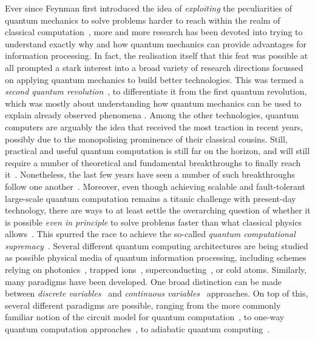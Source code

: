 Ever since Feynman first introduced the idea of \emph{exploiting} the peculiarities of quantum mechanics to solve problems harder to reach within the realm of classical computation~\cite{feynman1982simulating}, more and more research has been devoted into trying to understand exactly why and how quantum mechanics can provide advantages for information processing.
In fact, the realisation itself that this feat was possible at all prompted a stark interest into a broad variety of research directions focussed on applying quantum mechanics to build better technologies. This was termed a \textit{second quantum revolution}~\cite{dowling2003quantum}, to differentiate it from the first quantum revolution, which was mostly about understanding how quantum mechanics can be used to explain already observed phenomena .
Among the other technologies, quantum computers are arguably the idea that received the most traction in recent years, possibly due to the monopolising prominence of their classical cousins.
Still, practical and useful quantum computation is still far on the horizon, and will still require a number of theoretical and fundamental breakthroughs to finally reach it~\cite{preskill2018quantum,flamini2018photonic,wang2019integrated}.
Nonetheless, the last few years have seen a number of such breakthroughs follow one another~\cite{fowler2012surface,barends2014superconducting,córcoles2015demonstration,ofek2016extending,arute2019quantum}.
Moreover, even though achieving scalable and fault-tolerant large-scale quantum computation remains a titanic challenge with present-day technology, there are ways to at least settle the overarching question of whether it is possible \textit{even in principle} to solve problems faster than what classical physics allows~\cite{aaronson2011computational,bremner2016average,boixo2018characterizing,aaronson2017complexity,neill2018blueprint}. This spurred the race to achieve the so-called \textit{quantum computational supremacy}~\cite{broome2012photonic,spring2012boson,crespi2013integrated,tillmann2013experimental,bentivegna2015experimental,zhong201812photon,zhong2019experimental,wang2019boson,bouland2018complexity,arute2019quantum}.
Several different quantum computing architectures are being studied as possible physical media of quantum information processing, including schemes relying on photonics~\cite{wang2019integrated,flamini2018photonic}, trapped ions~\cite{bruzewicz2019trappedion,lekitsch2017blueprint}, superconducting~\cite{krantz2019quantum,you2011atomic}, or cold atoms.
Similarly, many paradigms have been developed. One broad distinction can be made between \textit{discrete variables}~\cite{walmsley2005applied,andersen2015hybrid} and \textit{continuous variables}~\cite{lloyd1999quantum,braunstein2005quantum} approaches.
On top of this, several different paradigms are possible, ranging from the more commonly familiar notion of the circuit model for quantum computation~\cite{nielsen2006quantum}, to one-way quantum computation approaches~\cite{raussendorf2001one,walther2005experimental,browne2006one}, to adiabatic quantum computing~\cite{aharonov2004adiabatic,albash2018adiabatic}.

